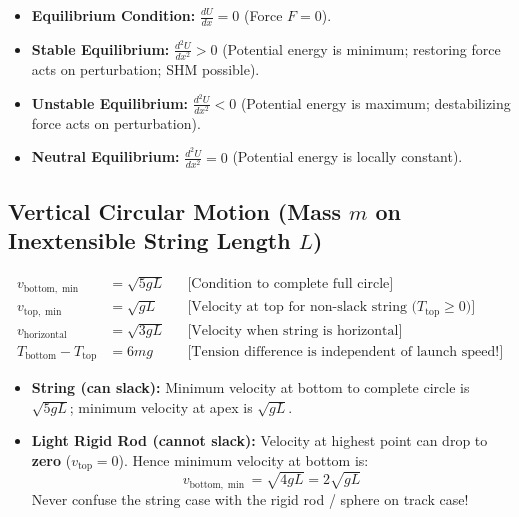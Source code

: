 \documentclass[10pt,twoside,openright]{book}
\begin{document}
\begin{usecasebox}
\begin{itemize}
  \item \textbf{Equilibrium Condition:} $\frac{dU}{dx} = 0$ (Force $F=0$).
  \item \textbf{Stable Equilibrium:} $\frac{d^2 U}{dx^2} > 0$ (Potential energy is minimum; restoring force acts on perturbation; SHM possible).
  \item \textbf{Unstable Equilibrium:} $\frac{d^2 U}{dx^2} < 0$ (Potential energy is maximum; destabilizing force acts on perturbation).
  \item \textbf{Neutral Equilibrium:} $\frac{d^2 U}{dx^2} = 0$ (Potential energy is locally constant).
\end{itemize}
\end{usecasebox}

\subsection{Vertical Circular Motion (Mass $m$ on Inextensible String Length $L$)}

\begin{formulabox}
\begin{align}
  v_{\text{bottom},\min} &= \sqrt{5gL} && \text{[Condition to complete full circle]} \\
  v_{\text{top},\min} &= \sqrt{gL} && \text{[Velocity at top for non-slack string ($T_{\text{top}} \ge 0$)]} \\
  v_{\text{horizontal}} &= \sqrt{3gL} && \text{[Velocity when string is horizontal]} \\
  T_{\text{bottom}} - T_{\text{top}} &= 6mg && \text{[Tension difference is independent of launch speed!]}
\end{align}
\end{formulabox}

\begin{trapbox}
\begin{itemize}
  \item \textbf{String (can slack):} Minimum velocity at bottom to complete circle is $\sqrt{5gL}$; minimum velocity at apex is $\sqrt{gL}$.
  \item \textbf{Light Rigid Rod (cannot slack):} Velocity at highest point can drop to \textbf{zero} ($v_{\text{top}} = 0$). Hence minimum velocity at bottom is:
  \begin{equation*}
    v_{\text{bottom},\min} = \sqrt{4gL} = 2\sqrt{gL}
  \end{equation*}
  Never confuse the string case with the rigid rod / sphere on track case!
\end{itemize}
\end{trapbox}
\end{document}
